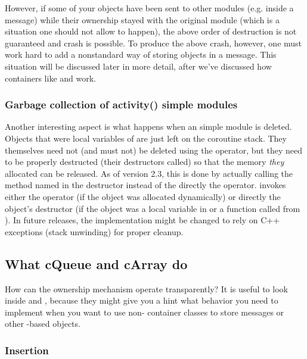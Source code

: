 However, if some of your objects have been sent to other modules
(e.g. inside a message)
while their ownership stayed with the original module (which is a
situation one should not allow to happen), the above order of destruction
is not guaranteed and crash is possible. To produce the above crash, however,
one must work hard to add a nonstandard way of storing objects in a message.
This situation will be discussed later in more detail, after we've discussed
how containers like  and  work.

\subsubsection{Garbage collection of activity() simple modules}

Another interesting aspect is what happens when an 
simple module is deleted. Objects that were local variables
of  are just left on the coroutine stack.
They themselves need not (and must not) be deleted using the
 operator, but they need to be properly destructed
(their destructors called) so that the memory \textit{they} allocated
can be released. As of {\opp} version 2.3, this is done by actually
calling the method named  in the  destructor
instead of the directly the  operator. 
invokes either the  operator (if the object was allocated
dynamically) or directly the object's destructor (if the object was
a local variable in  or a function called from
). In future releases, the implementation might
be changed to rely on C++ exceptions (stack unwinding) for proper
cleanup.


\subsection{What cQueue and cArray do}

How can the ownership mechanism operate transparently?
It is useful to look inside  and ,
because they might give you a hint what behavior you need
to implement when you want to use non-{\opp} container classes
to store messages or other -based objects.

\subsubsection{Insertion}

